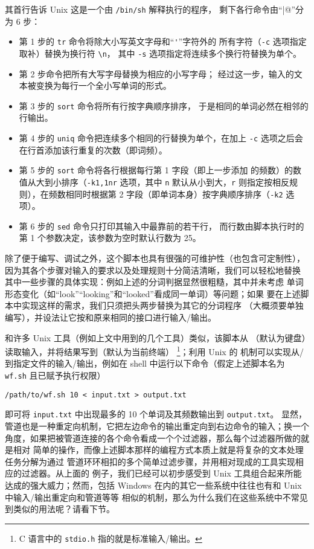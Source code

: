 其首行告诉 Unix 这是一个由 \verb|/bin/sh| 解释执行的程序，
剩下各行命令由“\verb@|@”分为 6 步：
\begin{itemize}
\item 第 1 步的 \verb|tr| 命令将除大小写英文字母和“\verb|'|”字符外的
	所有字符（\verb|-c| 选项指定取补）替换为换行符 \verb|\n|，
	其中 \verb|-s| 选项指定将连续多个换行符替换为单个。
\item 第 2 步命令把所有大写字母替换为相应的小写字母；
	经过这一步，输入的文本被变换为每行一个全小写单词的形式。
\item 第 3 步的 \verb|sort| 命令将所有行按字典顺序排序，
	于是相同的单词必然在相邻的行输出。
\item 第 4 步的 \verb|uniq| 命令把连续多个相同的行替换为单个，在加上
	\verb|-c| 选项之后会在行首添加该行重复的次数（即词频）。
\item 第 5 步的 \verb|sort| 命令将各行根据每行第 1 字段（即上一步添加
	的频数）的数值从大到小排序（\verb|-k1,1nr| 选项，其中 \verb|n|
	默认从小到大，\verb|r| 则指定按相反规则），在频数相同时根据第
	2 字段（即单词本身）按字典顺序排序（\verb|-k2| 选项）。
\item 第 6 步的 \verb|sed| 命令只打印其输入中最靠前的若干行，
	而行数由脚本执行时的第 1 个参数决定，该参数为空时默认行数为 25。
\end{itemize}
除了便于编写、调试之外，这个脚本也具有很强的可维护性（也包含可定制性），
因为其各个步骤对输入的要求以及处理规则十分简洁清晰，我们可以轻松地替换
其中一些步骤的具体实现：例如上述的分词判据显然很粗糙，其中并未考虑
单词形态变化（如“look”“looking”和“looked”看成同一单词）等问题；如果
要在上述脚本中实现这样的需求，我们只须把头两步替换为其它的分词程序
（大概须要单独编写），并设法让它按和原来相同的接口进行输入/输出。

和许多 Unix 工具（例如上文中用到的几个工具）类似，该脚本从%
（默认为键盘）读取输入，并将结果写到（默认为当前终端）%
\footnote{C 语言中的 \texttt{stdio.h} 指的就是标准输入/输出。}；利用 Unix 的%
机制可以实现从/到指定文件的输入/输出，例如在 shell
中运行以下命令（假定上述脚本名为 \verb|wf.sh| 且已赋予执行权限）
\begin{wquoting}
\begin{Verbatim}
/path/to/wf.sh 10 < input.txt > output.txt
\end{Verbatim}
\end{wquoting}
即可将 \verb|input.txt| 中出现最多的 10 个单词及其频数输出到 \verb|output.txt|。
显然，管道也是一种重定向机制，它把左边命令的输出重定向到右边命令的输入；换一个
角度，如果把被管道连接的各个命令看成一个个过滤器，那么每个过滤器所做的就是相对
简单的操作，而像上述脚本那样的编程方式本质上就是将复杂的文本处理任务分解为通过
管道环环相扣的多个简单过滤步骤，并用相对现成的工具实现相应的过滤器。从上面的
例子，我们已经可以初步感受到 Unix 工具组合起来所能达成的强大威力；然而，包括
Windows 在内的其它一些系统中往往也有和 Unix 中输入/输出重定向和管道等等
相似的机制，那么为什么我们在这些系统中不常见到类似的用法呢？请看下节。

